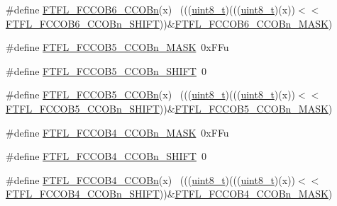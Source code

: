 \begin{DoxyCompactItemize}
\item 
\#define \hyperlink{group___f_t_f_l___register___masks_ga23851d5ddfef9a0b708fb1ac5f0fa1ed}{F\+T\+F\+L\+\_\+\+F\+C\+C\+O\+B6\+\_\+\+C\+C\+O\+Bn}(x)                                      ~(((\hyperlink{_p_e___types_8h_aba7bc1797add20fe3efdf37ced1182c5}{uint8\+\_\+t})(((\hyperlink{_p_e___types_8h_aba7bc1797add20fe3efdf37ced1182c5}{uint8\+\_\+t})(x))$<$$<$\hyperlink{group___f_t_f_l___register___masks_gae2e3b638ebffcc78278d4901209fa7cf}{F\+T\+F\+L\+\_\+\+F\+C\+C\+O\+B6\+\_\+\+C\+C\+O\+Bn\+\_\+\+S\+H\+I\+FT}))\&\hyperlink{group___f_t_f_l___register___masks_gad2e7d2a86141cb1cd93c20f49ccb9299}{F\+T\+F\+L\+\_\+\+F\+C\+C\+O\+B6\+\_\+\+C\+C\+O\+Bn\+\_\+\+M\+A\+SK})
\item 
\#define \hyperlink{group___f_t_f_l___register___masks_ga7b360c0830ca8e08c530a582541b8b9d}{F\+T\+F\+L\+\_\+\+F\+C\+C\+O\+B5\+\_\+\+C\+C\+O\+Bn\+\_\+\+M\+A\+SK}~0x\+F\+Fu
\item 
\#define \hyperlink{group___f_t_f_l___register___masks_gabe8f033cc629cc2da0f98d7384bcd95c}{F\+T\+F\+L\+\_\+\+F\+C\+C\+O\+B5\+\_\+\+C\+C\+O\+Bn\+\_\+\+S\+H\+I\+FT}~0
\item 
\#define \hyperlink{group___f_t_f_l___register___masks_gae31beca41bb5491b89816159cd35f2e3}{F\+T\+F\+L\+\_\+\+F\+C\+C\+O\+B5\+\_\+\+C\+C\+O\+Bn}(x)                                      ~(((\hyperlink{_p_e___types_8h_aba7bc1797add20fe3efdf37ced1182c5}{uint8\+\_\+t})(((\hyperlink{_p_e___types_8h_aba7bc1797add20fe3efdf37ced1182c5}{uint8\+\_\+t})(x))$<$$<$\hyperlink{group___f_t_f_l___register___masks_gabe8f033cc629cc2da0f98d7384bcd95c}{F\+T\+F\+L\+\_\+\+F\+C\+C\+O\+B5\+\_\+\+C\+C\+O\+Bn\+\_\+\+S\+H\+I\+FT}))\&\hyperlink{group___f_t_f_l___register___masks_ga7b360c0830ca8e08c530a582541b8b9d}{F\+T\+F\+L\+\_\+\+F\+C\+C\+O\+B5\+\_\+\+C\+C\+O\+Bn\+\_\+\+M\+A\+SK})
\item 
\#define \hyperlink{group___f_t_f_l___register___masks_gacf14a3998b383208d9afab60b561667e}{F\+T\+F\+L\+\_\+\+F\+C\+C\+O\+B4\+\_\+\+C\+C\+O\+Bn\+\_\+\+M\+A\+SK}~0x\+F\+Fu
\item 
\#define \hyperlink{group___f_t_f_l___register___masks_ga0d53c20a9a46795ddfe5bd46653d101d}{F\+T\+F\+L\+\_\+\+F\+C\+C\+O\+B4\+\_\+\+C\+C\+O\+Bn\+\_\+\+S\+H\+I\+FT}~0
\item 
\#define \hyperlink{group___f_t_f_l___register___masks_ga553af55bc5cc70f4081aad049bf2872c}{F\+T\+F\+L\+\_\+\+F\+C\+C\+O\+B4\+\_\+\+C\+C\+O\+Bn}(x)                                      ~(((\hyperlink{_p_e___types_8h_aba7bc1797add20fe3efdf37ced1182c5}{uint8\+\_\+t})(((\hyperlink{_p_e___types_8h_aba7bc1797add20fe3efdf37ced1182c5}{uint8\+\_\+t})(x))$<$$<$\hyperlink{group___f_t_f_l___register___masks_ga0d53c20a9a46795ddfe5bd46653d101d}{F\+T\+F\+L\+\_\+\+F\+C\+C\+O\+B4\+\_\+\+C\+C\+O\+Bn\+\_\+\+S\+H\+I\+FT}))\&\hyperlink{group___f_t_f_l___register___masks_gacf14a3998b383208d9afab60b561667e}{F\+T\+F\+L\+\_\+\+F\+C\+C\+O\+B4\+\_\+\+C\+C\+O\+Bn\+\_\+\+M\+A\+SK})
$$
\end{DoxyCompactItemize}
